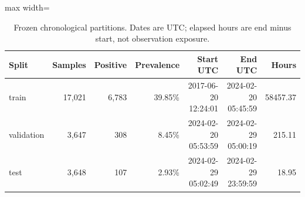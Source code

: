 \begin{table}[H]
\caption{Frozen chronological partitions. Dates are UTC; elapsed hours are end minus start, not observation exposure.}\label{tab:split}
\centering\small
\begin{adjustbox}{max width=\linewidth}
\begin{tabular}{lrrrrrr}
\toprule
Split & Samples & Positive & Prevalence & Start UTC & End UTC & Hours \\
\midrule
train & 17,021 & 6,783 & 39.85\% & 2017-06-20 12:24:01 & 2024-02-20 05:45:59 & 58457.37 \\
validation & 3,647 & 308 & 8.45\% & 2024-02-20 05:53:59 & 2024-02-29 05:00:19 & 215.11 \\
test & 3,648 & 107 & 2.93\% & 2024-02-29 05:02:49 & 2024-02-29 23:59:59 & 18.95 \\
\bottomrule
\end{tabular}
\end{adjustbox}
\end{table}
